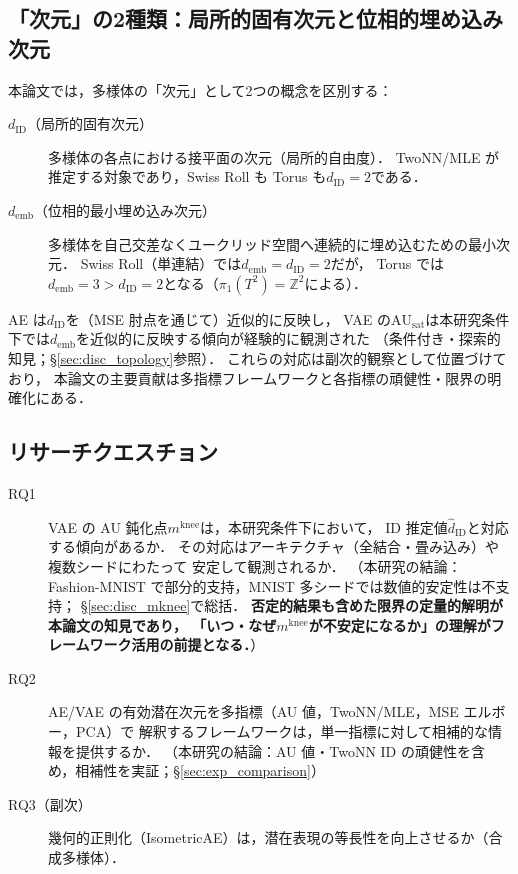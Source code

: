 \documentclass[11pt,a4paper]{jsarticle}
\newcommand{\dID}{d_{\mathrm{ID}}}
\newcommand{\AUsat}{\mathrm{AU}_{\mathrm{sat}}}
\newcommand{\mknee}{m^{\mathrm{knee}}}
\newcommand{\demb}{d_{\mathrm{emb}}}
\begin{document}
\subsection{「次元」の2種類：局所的固有次元と位相的埋め込み次元}\label{sec:intro_dim}

本論文では，多様体の「次元」として2つの概念を区別する：

\begin{description}
  \item[$\dID$（局所的固有次元）]
        多様体の各点における接平面の次元（局所的自由度）．
        TwoNN/MLE が推定する対象であり，Swiss Roll も Torus も$\dID = 2$である．
  \item[$\demb$（位相的最小埋め込み次元）]
        多様体を自己交差なくユークリッド空間へ連続的に埋め込むための最小次元．
        Swiss Roll（単連結）では$\demb = \dID = 2$だが，
        Torus では$\demb = 3 > \dID = 2$となる（$\pi_1(T^2) = \mathbb{Z}^2$による）．
\end{description}

AE は$\dID$を（MSE 肘点を通じて）近似的に反映し，
VAE の$\AUsat$は本研究条件下では$\demb$を近似的に反映する傾向が経験的に観測された
（条件付き・探索的知見；§\ref{sec:disc_topology}参照）．
これらの対応は副次的観察として位置づけており，
本論文の主要貢献は多指標フレームワークと各指標の頑健性・限界の明確化にある．

\subsection{リサーチクエスチョン}\label{sec:intro_rq}

\begin{description}
  \item[RQ1] VAE の AU 鈍化点$\mknee$は，本研究条件下において，
             ID 推定値$\hat{d}_\mathrm{ID}$と対応する傾向があるか．
             その対応はアーキテクチャ（全結合・畳み込み）や複数シードにわたって
             安定して観測されるか．
             （本研究の結論：Fashion-MNIST で部分的支持，MNIST 多シードでは数値的安定性は不支持；
             §\ref{sec:disc_mknee}で総括．
             \textbf{否定的結果も含めた限界の定量的解明が本論文の知見であり，
             「いつ・なぜ$\mknee$が不安定になるか」の理解がフレームワーク活用の前提となる．}）
  \item[RQ2] AE/VAE の有効潜在次元を多指標（AU 値，TwoNN/MLE，MSE エルボー，PCA）で
             解釈するフレームワークは，単一指標に対して相補的な情報を提供するか．
             （本研究の結論：AU 値・TwoNN ID の頑健性を含め，相補性を実証；§\ref{sec:exp_comparison}）
  \item[RQ3（副次）] 幾何的正則化（IsometricAE）は，潜在表現の等長性を向上させるか（合成多様体）．
\end{description}
\end{document}
